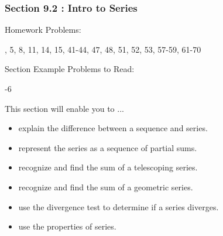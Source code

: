 %
%

\begin{frame}
\frametitle{\Large {\color[rgb]{0.02,0.20,1.0} Section 9.2 : Intro to Series}}
\scriptsize
\vspace{0.4cm}
\begin{block}{Homework Problems:}

\vspace{0.2cm}
, 5, 8, 11, 14, 15, 41-44, 47, 48, 51, 52, 53, 57-59, 61-70 
	
\end{block}
\vspace{0.5cm}

\begin{block}{Section Example Problems to Read:}

\vspace{0.2cm}
-6
	
\end{block}
\vspace{0.2cm}

\begin{block}{This section will enable you to ...}
\begin{itemize}
	\item[...] explain the difference between a sequence and series.
	\item[...] represent the series as a sequence of partial sums.
	\item[...] recognize and find the sum of a telescoping series.
	\item[...] recognize and find the sum of a geometric series.
	\item[...] use the divergence test to determine if a series diverges.
	\item[...] use the properties of series.
\end{itemize}
\end{block}
\vspace{3.0cm}
\end{frame}

